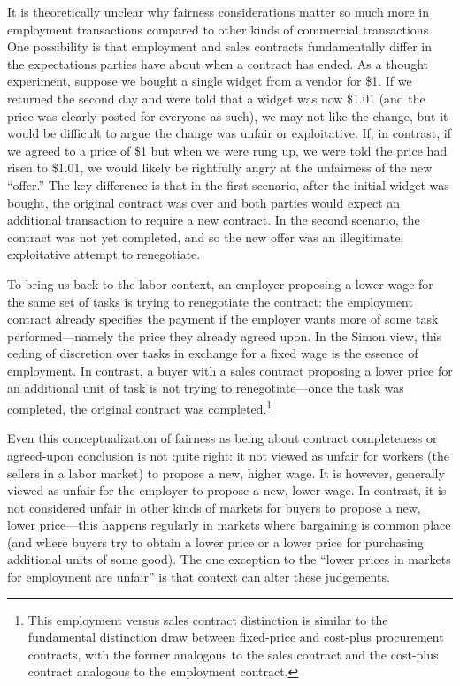 \documentclass[11pt]{article}
\begin{document}
It is theoretically unclear why fairness considerations matter so much more in employment transactions compared to other kinds of commercial transactions.
One possibility is that employment and sales contracts fundamentally differ in the expectations parties have about when a contract has ended. 
As a thought experiment, suppose we bought a single widget from a vendor for \$1.
If we returned the second day and were told that a widget was now \$1.01 (and the price was clearly posted for everyone as such), we may not like the change, but it would be difficult to argue the change was unfair or exploitative.
If, in contrast, if we agreed to a price of \$1 but when we were rung up, we were told the price had risen to \$1.01, we would likely be rightfully angry at the unfairness of the new ``offer.'' 
The key difference is that in the first scenario, after the initial widget was bought, the original contract was over and both parties would expect an additional transaction to require a new contract. 
In the second scenario, the contract was not yet completed, and so the new offer was an illegitimate, exploitative attempt to renegotiate.  

To bring us back to the labor context, an employer proposing a lower wage for the same set of tasks is trying to renegotiate the contract: 
the employment contract already specifies the payment if the employer wants more of some task performed---namely the price they already agreed upon.
In the Simon view, this ceding of discretion over tasks in exchange for a fixed wage is the essence of employment. 
In contrast, a buyer with a sales contract proposing a lower price for an additional unit of task is not trying to renegotiate---once the task was completed, the original contract was completed.\footnote{
This employment versus sales contract distinction is similar to the fundamental distinction \cite{bajari2001incentives} draw between fixed-price and cost-plus procurement contracts, with the former analogous to the sales contract and the cost-plus contract analogous to the employment contract.  
}

Even this conceptualization of fairness as being about contract completeness or agreed-upon conclusion is not quite right:
it not viewed as unfair for workers (the sellers in a labor market) to propose a new, higher wage.
It is however, generally viewed as unfair for the employer to propose a new, lower wage.
In contrast, it is not considered unfair in other kinds of markets for buyers to propose a new, lower price---this happens regularly in markets where bargaining is common place (and where buyers try to obtain a lower price or a lower price for purchasing additional units of some good). 
The one exception to the ``lower prices in markets for employment are unfair'' is that context can alter these judgements. 
\end{document}

